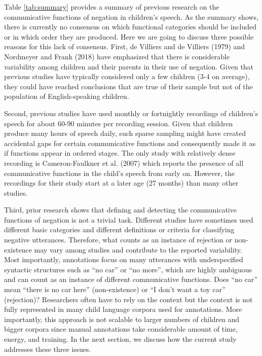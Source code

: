 \documentclass[
  man,floatsintext]{apa6}
\begin{document}
Table \ref{tab:summary} provides a summary of previous research on the communicative functions of negation in children's speech. As the summary shows, there is currently no consensus on which functional categories should be included or in which order they are produced. Here we are going to discuss three possible reasons for this lack of consensus. First, de Villiers and de Villiers (1979) and Nordmeyer and Frank (2018) have emphasized that there is considerable variability among children and their parents in their use of negation. Given that previous studies have typically considered only a few children (3-4 on average), they could have reached conclusions that are true of their sample but not of the population of English-speaking children.

Second, previous studies have used monthly or fortnightly recordings of children's speech for about 60-90 minutes per recording session. Given that children produce many hours of speech daily, such sparse sampling might have created accidental gaps for certain communicative functions and consequently made it as if functions appear in ordered stages. The only study with relatively dense recording is Cameron-Faulkner et al. (2007) which reports the presence of all communicative functions in the child's speech from early on. However, the recordings for their study start at a later age (27 months) than many other studies.

Third, prior research shows that defining and detecting the communicative functions of negation is not a trivial task. Different studies have sometimes used different basic categories and different definitions or criteria for classifying negative utterances. Therefore, what counts as an instance of rejection or non-existence may vary among studies and contribute to the reported variability. Most importantly, annotations focus on many utterances with underspecified syntactic structures such as ``no car'' or ``no more'', which are highly ambiguous and can count as an instance of different communicative functions. Does ``no car'' mean ``there is no car here'' (non-existence) or ``I don't want a toy car'' (rejection)? Researchers often have to rely on the context but the context is not fully represented in many child language corpora used for annotations. More importantly, this approach is not scalable to larger numbers of children and bigger corpora since manual annotations take considerable amount of time, energy, and training. In the next section, we discuss how the current study addresses these three issues.
\end{document}
